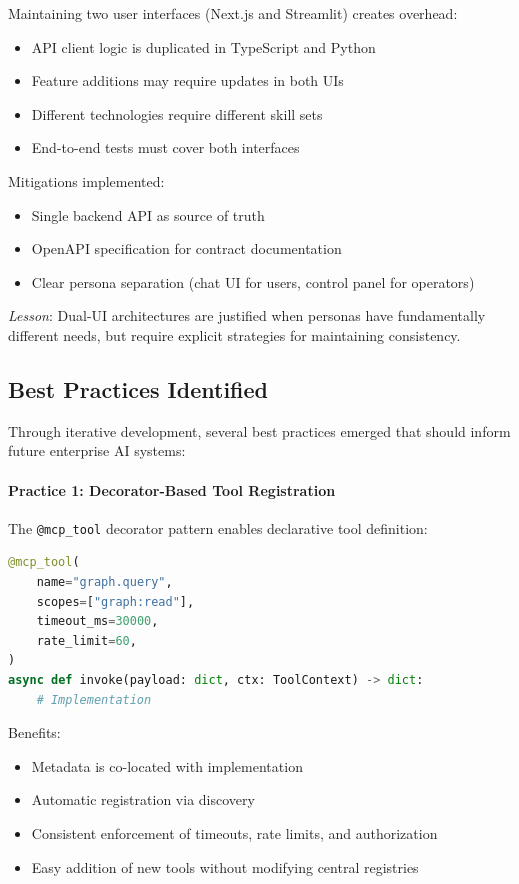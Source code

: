 Maintaining two user interfaces (Next.js and Streamlit) creates overhead:

\begin{itemize}
    \item API client logic is duplicated in TypeScript and Python
    \item Feature additions may require updates in both UIs
    \item Different technologies require different skill sets
    \item End-to-end tests must cover both interfaces
\end{itemize}

Mitigations implemented:
\begin{itemize}
    \item Single backend API as source of truth
    \item OpenAPI specification for contract documentation
    \item Clear persona separation (chat UI for users, control panel for operators)
\end{itemize}

\textit{Lesson}: Dual-UI architectures are justified when personas have fundamentally different needs, but require explicit strategies for maintaining consistency.

\subsection{Best Practices Identified}

Through iterative development, several best practices emerged that should inform future enterprise AI systems:

\paragraph{Practice 1: Decorator-Based Tool Registration}

The \texttt{@mcp\_tool} decorator pattern enables declarative tool definition:

\begin{lstlisting}[language=Python]
@mcp_tool(
    name="graph.query",
    scopes=["graph:read"],
    timeout_ms=30000,
    rate_limit=60,
)
async def invoke(payload: dict, ctx: ToolContext) -> dict:
    # Implementation
\end{lstlisting}

Benefits:
\begin{itemize}
    \item Metadata is co-located with implementation
    \item Automatic registration via discovery
    \item Consistent enforcement of timeouts, rate limits, and authorization
    \item Easy addition of new tools without modifying central registries
\end{itemize}

